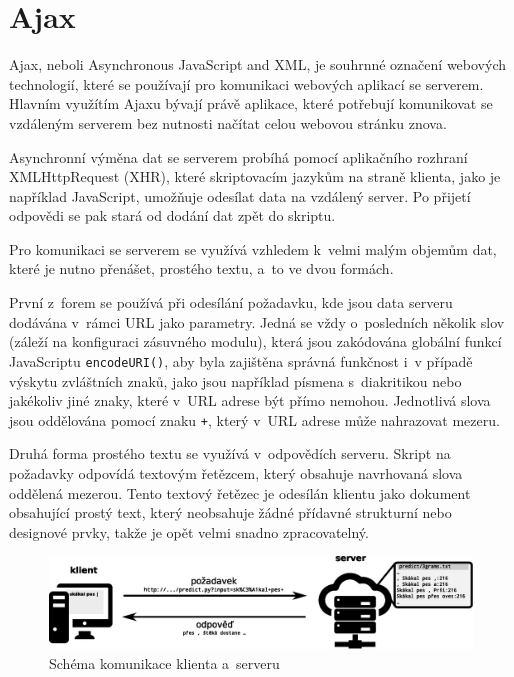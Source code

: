\documentclass[a4paper,11pt,openany]{book} %
\begin{document}
\section{Ajax}

Ajax, neboli Asynchronous JavaScript and XML, je souhrnné označení webových technologií, které se používají pro komunikaci webových aplikací se serverem. Hlavním využítím Ajaxu bývají právě aplikace, které potřebují komunikovat se vzdáleným serverem bez nutnosti načítat celou webovou stránku znova. \parencite{garrett2005ajax}

Asynchronní výměna dat se serverem probíhá pomocí aplikačního rozhraní XMLHttpRequest (XHR), které skriptovacím jazykům na straně klienta, jako je například JavaScript, umožňuje odesílat data na vzdálený server. Po přijetí odpovědi se pak stará od dodání dat zpět do skriptu.

Pro komunikaci se serverem se využívá vzhledem k~velmi malým objemům dat, které je nutno přenášet, prostého textu, a~to ve dvou formách. 

První z~forem se používá při odesílání požadavku, kde jsou data serveru dodávána v~rámci URL jako parametry. Jedná se vždy o~posledních několik slov (záleží na konfiguraci zásuvného modulu), která jsou zakódována globální funkcí JavaScriptu {\tt encodeURI()}, aby byla zajištěna správná funkčnost i~v případě výskytu zvláštních znaků, jako jsou například písmena s~diakritikou nebo jakékoliv jiné znaky, které v~URL adrese být přímo nemohou. Jednotlivá slova jsou oddělována pomocí znaku {\tt +}, který v~URL adrese může nahrazovat mezeru.

Druhá forma prostého textu se využívá v~odpovědích serveru. Skript na požadavky odpovídá textovým řetězcem, který obsahuje navrhovaná slova oddělená mezerou. Tento textový řetězec je odesílán klientu jako dokument obsahující prostý text, který neobsahuje žádné přídavné strukturní nebo designové prvky, takže je opět velmi snadno zpracovatelný.

\begin{figure}[h]
	\centering
	\includegraphics[width=1.0\textwidth]{client-server-schema1.eps}
	\caption{Schéma komunikace klienta a~serveru\protect\footnotemark}
	\label{fig:clientserver}
\end{figure}
\end{document}
